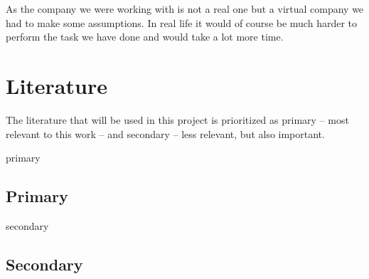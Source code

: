 \documentclass[a4paper]{article}
\begin{document}
As the company we were working with is not a real one but a virtual company we had to make some assumptions. In real life it would of course be much harder to perform the task we have done and would take a lot more time. 

\newpage
\appendix
\section{Literature}

The literature that will be used in this project is prioritized as primary -- most relevant to this work -- and secondary -- less relevant, but also important. 
\begin{btSect}[alpha]{primary}
\subsection{Primary}
\btPrintAll
\end{btSect}

\begin{btSect}[alpha]{secondary}
\subsection{Secondary}
\btPrintAll
\end{btSect}
\end{document}
